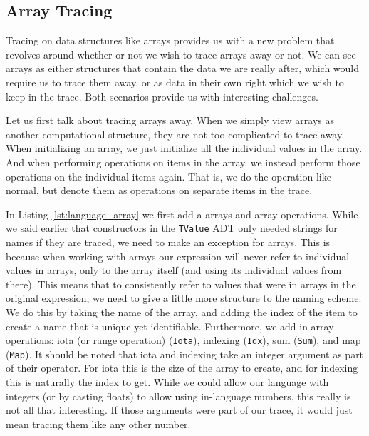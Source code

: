     \subsection{Array Tracing} \label{sec:arrays}
        Tracing on data structures like arrays provides us with a new problem that revolves around whether or not we wish to trace arrays away or not.
        We can see arrays as either structures that contain the data we are really after, which would require us to trace them away, or as data in their own right which we wish to keep in the trace.
        Both scenarios provide us with interesting challenges.
        
        Let us first talk about tracing arrays away.
        When we simply view arrays as another computational structure, they are not too complicated to trace away.
        When initializing an array, we just initialize all the individual values in the array.
        And when performing operations on items in the array, we instead perform those operations on the individual items again.
        That is, we do the operation like normal, but denote them as operations on separate items in the trace.
        
        In Listing \ref{lst:language_array} we first add a arrays and array operations.
        While we said earlier that constructors in the \texttt{TValue} ADT only needed strings for names if they are traced, we need to make an exception for arrays.
        This is because when working with arrays our expression will never refer to individual values in arrays, only to the array itself (and using its individual values from there).
        This means that to consistently refer to values that were in arrays in the original expression, we need to give a little more structure to the naming scheme.
        We do this by taking the name of the array, and adding the index of the item to create a name that is unique yet identifiable. 
        Furthermore, we add in array operations: iota (or range operation) (\texttt{Iota}), indexing (\texttt{Idx}), sum (\texttt{Sum}), and map (\texttt{Map}).
        It should be noted that iota and indexing take an integer argument as part of their operator.
        For iota this is the size of the array to create, and for indexing this is naturally the index to get.
        While we could allow our language with integers (or by casting floats) to allow using in-language numbers, this really is not all that interesting.
        If those arguments were part of our trace, it would just mean tracing them like any other number.

